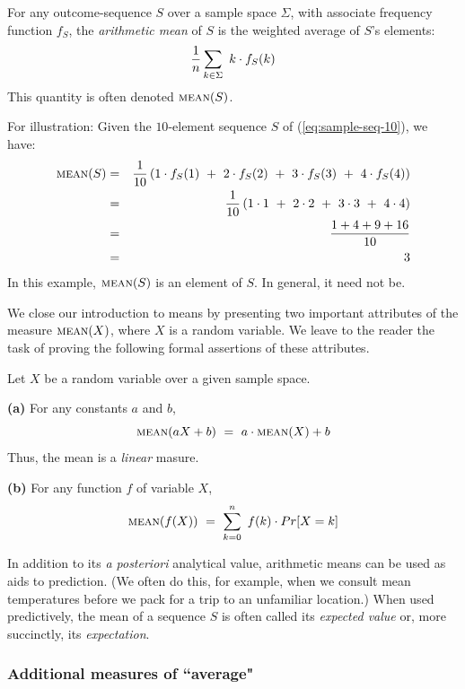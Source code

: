    
For any outcome-sequence $S$ over a sample space $\Sigma$, with associate frequency function $f_S$, the {\it arithmetic mean} of $S$ is the weighted average of $S$'s elements:
\[ {1 \over n} \sum_{k \in \Sigma} \ k \cdot f_S(k) \]
This quantity is often denoted $\mbox{\sc mean}(S)$.  

For illustration: Given the $10$-element sequence $S$ of (\ref{eq:sample-seq-10}), we have:
\begin{eqnarray*}
\mbox{\sc mean}(S) & = &
{1 \over 10} \left(1 \cdot f_S(1) \ + \ 2 \cdot f_S(2) \ + \ 3 \cdot f_S(3) \ + \ 4 \cdot f_S(4) \right) \\
 & = &
{1 \over 10} \left(1 \cdot 1 \ + \ 2 \cdot 2 \ + \ 3 \cdot 3 \ + \ 4 \cdot 4 \right) \\
 & = &
\frac{1 + 4 + 9 + 16}{10} \\
 & = & 3
\end{eqnarray*}
In this example, $\mbox{\sc mean}(S)$ is an element of $S$.  In general, it need not be.

We close our introduction to means by presenting two important
attributes of the measure $\mbox{\sc mean}(X)$, where $X$ is a random
variable.  We leave to the reader the task of proving the following
formal assertions of these attributes.

\begin{prop} 
\label{thm:mean-linear}
Let $X$ be a random variable over a given sample space.

{\bf (a)} For any constants $a$ and $b$,
\[ \mbox{\sc mean}(aX+b) \ = \ a \cdot \mbox{\sc mean}(X) + b  \]
Thus, the mean is a {\em linear} masure.

{\bf (b)} For any function $f$ of variable $X$,
\[ \mbox{\sc mean}(f(X)) \ = \ \sum_{k=0}^n \ f(k) \cdot Pr[X = k] \]
\end{prop}

\bigskip

In addition to its {\em a posteriori} analytical value, arithmetic means can be used as aids to prediction.  (We often do this, for example, when we consult mean temperatures before we pack for a trip to an unfamiliar location.)  When used predictively, the mean of a sequence $S$ is often called its {\it expected value} or, more succinctly, its {\it expectation}.
 

\subsubsection{Additional measures of ``average"}
\label{sec:median-mode}

